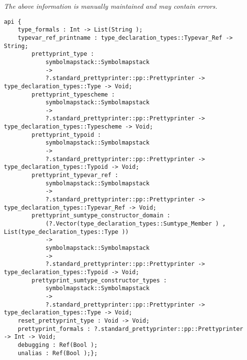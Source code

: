 \label{api:Prettyprint\_Type}

{\tiny \it The above information is manually maintained and may contain errors.}
\begin{verbatim}
api {
    type_formals : Int -> List(String );
    typevar_ref_printname : type_declaration_types::Typevar_Ref -> String;
        prettyprint_type :
            symbolmapstack::Symbolmapstack
            ->
            ?.standard_prettyprinter::pp::Prettyprinter -> type_declaration_types::Type -> Void;
        prettyprint_typescheme :
            symbolmapstack::Symbolmapstack
            ->
            ?.standard_prettyprinter::pp::Prettyprinter -> type_declaration_types::Typescheme -> Void;
        prettyprint_typoid :
            symbolmapstack::Symbolmapstack
            ->
            ?.standard_prettyprinter::pp::Prettyprinter -> type_declaration_types::Typoid -> Void;
        prettyprint_typevar_ref :
            symbolmapstack::Symbolmapstack
            ->
            ?.standard_prettyprinter::pp::Prettyprinter -> type_declaration_types::Typevar_Ref -> Void;
        prettyprint_sumtype_constructor_domain :
            (?.Vector(type_declaration_types::Sumtype_Member ) , List(type_declaration_types::Type ))
            ->
            symbolmapstack::Symbolmapstack
            ->
            ?.standard_prettyprinter::pp::Prettyprinter -> type_declaration_types::Typoid -> Void;
        prettyprint_sumtype_constructor_types :
            symbolmapstack::Symbolmapstack
            ->
            ?.standard_prettyprinter::pp::Prettyprinter -> type_declaration_types::Type -> Void;
    reset_prettyprint_type : Void -> Void;
    prettyprint_formals : ?.standard_prettyprinter::pp::Prettyprinter -> Int -> Void;
    debugging : Ref(Bool );
    unalias : Ref(Bool );};
\end{verbatim}
